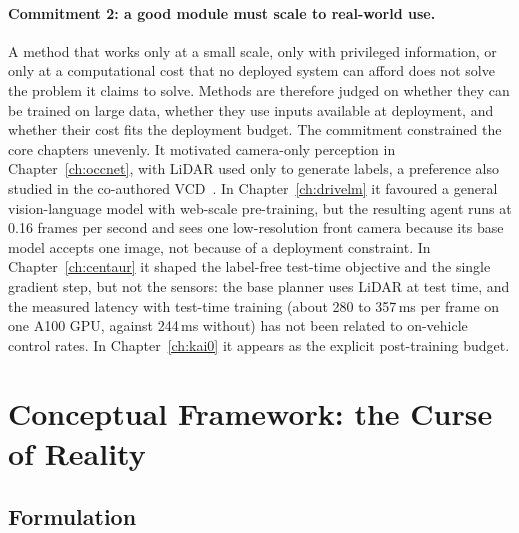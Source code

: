 \paragraph{Commitment 2: a good module must scale to real-world use.} A method that works only at a small scale, only with privileged information, or only at a computational cost that no deployed system can afford does not solve the problem it claims to solve. Methods are therefore judged on whether they can be trained on large data, whether they use inputs available at deployment, and whether their cost fits the deployment budget. The commitment constrained the core chapters unevenly. It motivated camera-only perception in Chapter~\ref{ch:occnet}, with LiDAR used only to generate labels, a preference also studied in the co-authored VCD~\cite{huang2023vcd}. In Chapter~\ref{ch:drivelm} it favoured a general vision-language model with web-scale pre-training, but the resulting agent runs at 0.16 frames per second and sees one low-resolution front camera because its base model accepts one image, not because of a deployment constraint. In Chapter~\ref{ch:centaur} it shaped the label-free test-time objective and the single gradient step, but not the sensors: the base planner uses LiDAR at test time, and the measured latency with test-time training (about 280 to 357\,ms per frame on one A100 GPU, against 244\,ms without) has not been related to on-vehicle control rates. In Chapter~\ref{ch:kai0} it appears as the explicit post-training budget.

\section{Conceptual Framework: the Curse of Reality}\label{sec:method:framework}

\subsection{Formulation}\label{sec:method:formulation}

